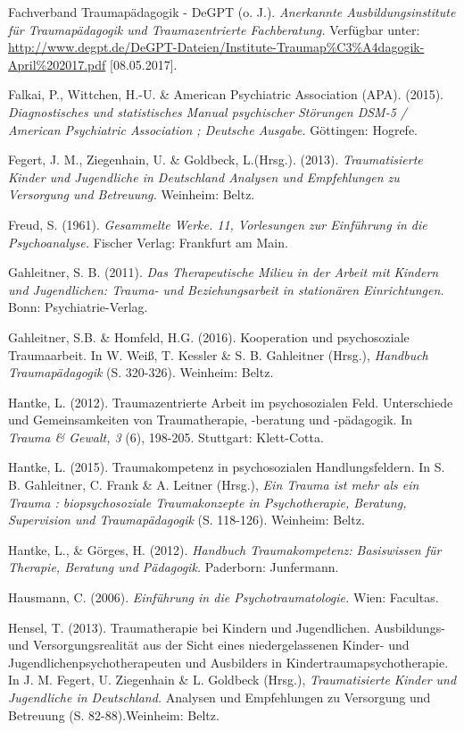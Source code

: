 \hang
Fachverband Traumapädagogik - DeGPT (o. J.). \textit{Anerkannte Ausbildungsinstitute für Traumapädagogik und Traumazentrierte Fachberatung.} Verfügbar unter: \url{http://www.degpt.de/DeGPT-Dateien/Institute-Traumap%C3%A4dagogik-April%202017.pdf} [08.05.2017].

\hang
Falkai, P., Wittchen, H.-U. \& American Psychiatric Association (APA). (2015). \textit{Diagnostisches und statistisches Manual psychischer Störungen DSM-5 / American Psychiatric Association ; Deutsche Ausgabe.} G{\"o}ttingen: Hogrefe.

\hang
Fegert, J. M., Ziegenhain, U. \& Goldbeck, L.(Hrsg.). (2013). \textit{Traumatisierte Kinder und Jugendliche in Deutschland Analysen und Empfehlungen zu Versorgung und Betreuung.} Weinheim: Beltz.

\hang
Freud, S. (1961). \textit{Gesammelte Werke. 11, Vorlesungen zur Einführung in die Psychoanalyse.} Fischer Verlag: Frankfurt am Main.

\hang
Gahleitner, S. B. (2011). \textit{Das Therapeutische Milieu in der Arbeit mit Kindern und Jugendlichen: Trauma- und Beziehungsarbeit in stationären Einrichtungen.} Bonn: Psychiatrie-Verlag.

\hang
Gahleitner, S.B. \& Homfeld, H.G. (2016). Kooperation und psychosoziale Traumaarbeit. In W. Weiß, T. Kessler \& S. B. Gahleitner (Hrsg.), \textit{Handbuch Traumapädagogik} (S. 320-326). Weinheim: Beltz.

\hang
Hantke, L. (2012). Traumazentrierte Arbeit im psychosozialen Feld. Unterschiede und Gemeinsamkeiten von Traumatherapie, -beratung und -pädagogik. In \textit{Trauma \& Gewalt, 3} (6), 198-205. Stuttgart: Klett-Cotta.

\hang
Hantke, L. (2015). Traumakompetenz in psychosozialen Handlungsfeldern. In S. B. Gahleitner, C. Frank \& A. Leitner (Hrsg.), \textit{Ein Trauma ist mehr als ein Trauma : biopsychosoziale Traumakonzepte in Psychotherapie, Beratung, Supervision und Traumapädagogik} (S. 118-126). Weinheim: Beltz.

\hang
Hantke, L., \& Görges, H. (2012). \textit{Handbuch Traumakompetenz: Basiswissen für Therapie, Beratung und Pädagogik.} Paderborn: Junfermann.

\hang
Hausmann, C. (2006). \textit{Einführung in die Psychotraumatologie.} Wien: Facultas.

\hang
Hensel, T. (2013). Traumatherapie bei Kindern und Jugendlichen. Ausbildungs- und Versorgungsrealit{\"a}t aus der Sicht eines niedergelassenen Kinder- und Jugendlichenpsychotherapeuten und Ausbilders in Kindertraumapsychotherapie. In J. M. Fegert, U. Ziegenhain \& L. Goldbeck (Hrsg.), \textit{Traumatisierte Kinder und Jugendliche in Deutschland.} Analysen und Empfehlungen zu Versorgung und Betreuung (S. 82-88).Weinheim: Beltz.

